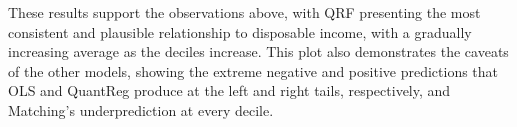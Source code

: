 These results support the observations above, with QRF presenting the most consistent and plausible relationship to disposable income, with a gradually increasing average as the deciles increase. This plot also demonstrates the caveats of the other models, showing the extreme negative and positive predictions that OLS and QuantReg produce at the left and right tails, respectively, and Matching's underprediction at every decile.
